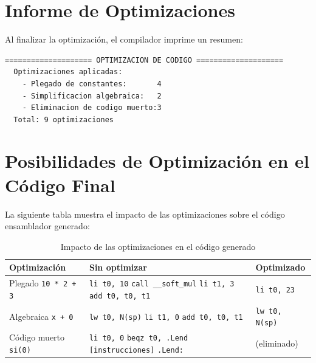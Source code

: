 \section{Informe de Optimizaciones}

Al finalizar la optimización, el compilador imprime un resumen:

\begin{verbatim}
==================== OPTIMIZACION DE CODIGO ====================
  Optimizaciones aplicadas:
    - Plegado de constantes:       4
    - Simplificacion algebraica:   2
    - Eliminacion de codigo muerto:3
  Total: 9 optimizaciones
\end{verbatim}

\section{Posibilidades de Optimización en el Código Final}

La siguiente tabla muestra el impacto de las optimizaciones sobre el código ensamblador generado:

\begin{table}[H]
\centering
\begin{tabular}{p{3.5cm}p{5cm}p{5cm}}
\toprule
\textbf{Optimización} & \textbf{Sin optimizar} & \textbf{Optimizado} \\
\midrule
Plegado \texttt{10 * 2 + 3} & 
\texttt{li t0, 10} \newline \texttt{call \_\_soft\_mul} \newline \texttt{li t1, 3} \newline \texttt{add t0, t0, t1} &
\texttt{li t0, 23} \\
\midrule
Algebraica \texttt{x + 0} &
\texttt{lw t0, N(sp)} \newline \texttt{li t1, 0} \newline \texttt{add t0, t0, t1} &
\texttt{lw t0, N(sp)} \\
\midrule
Código muerto \texttt{si(0)} &
\texttt{li t0, 0} \newline \texttt{beqz t0, .Lend} \newline \texttt{[instrucciones]} \newline \texttt{.Lend:} &
(eliminado) \\
\bottomrule
\end{tabular}
\caption{Impacto de las optimizaciones en el código generado}
\label{tab:opt-impact}
\end{table}
